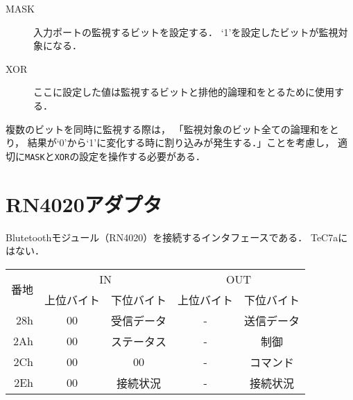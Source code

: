 \begin{description}
\item[MASK]
  入力ポートの監視するビットを設定する．
  `1'を設定したビットが監視対象になる．
\item[XOR]
  ここに設定した値は監視するビットと排他的論理和をとるために使用する．
\end{description}

複数のビットを同時に監視する際は，
「監視対象のビット全ての論理和をとり，
結果が`0'から`1'に変化する時に割り込みが発生する．」ことを考慮し，
適切に\texttt{MASK}と\texttt{XOR}の設定を操作する必要がある．

\section{RN4020アダプタ}
Blutetoothモジュール（RN4020）を接続するインタフェースである．
TeC7aにはない．

\begin{center}
  \small\begin{tabular}{| r | c | c || c | c |}\hline
    \multirow{2}{*}{番地}
    & \multicolumn{2}{|c||}{IN}
    & \multicolumn{2}{c|}{OUT}
    \\\cline{2-5}
         & 上位バイト & 下位バイト & 上位バイト & 下位バイト
    \\\hline\hline
    28h  &  00 & 受信データ
         &  -  & 送信データ \\\hline
    2Ah  &  00 & ステータス
         &  -  & 制御 \\\hline
    2Ch  &  00 & 00
         &  -  & コマンド \\\hline
    2Eh  &  00 & 接続状況
         &  -  & 接続状況 \\\hline
  \end{tabular}
\end{center}

